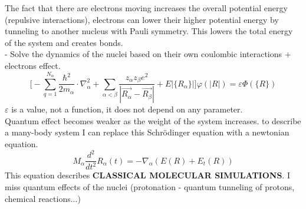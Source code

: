 The fact that there are electrons moving increases the overall potential energy (repulsive interactions), electrons can lower their higher potential energy by tunneling to another nucleus with Pauli symmetry. This lowers the total energy of the system and creates bonds.\\
- Solve the dynamics of the nuclei based on their own coulombic interactions + electrons effect.
\[
\bigg[-\sum_{q=1}^{N_{\alpha}}\frac{\hbar^2}{2m_{\alpha}}\cdot\nabla_{\alpha}^2
+\sum_{\alpha<\beta}\frac{z_{\alpha}z_{\beta}e^2}{|\vec{R_{\alpha}}-\vec{R_{\beta}}|}+E|\{R_\alpha\}| \bigg]\varphi(|R|)=\varepsilon\varPhi(\{R\})
\]
$\varepsilon$ is a value, not a function, it does not depend on any parameter.\\
Quantum effect becomes weaker as the weight of the system increases. to describe a many-body system I can replace this Schr\"odinger equation with a newtonian equation.\\
\[
M_\alpha\frac{d^2}{dt^2}R_\alpha(t)=-\nabla_\alpha(E(R)+E_t(R))
\]
This equation describes \textbf{CLASSICAL MOLECULAR SIMULATIONS}. I miss quantum effects of the nuclei (protonation - quantum tunneling of protons, chemical reactions...)\\

